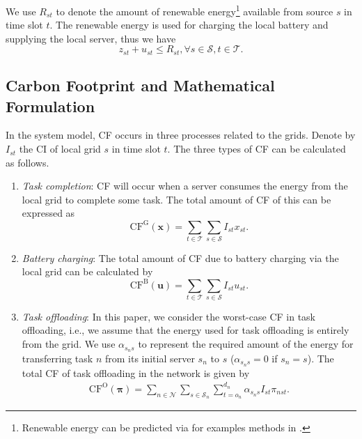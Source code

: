 \documentclass[conference, 10pt, ﬁnal, letterpaper, twocolumn]{IEEEtran}
\begin{document}
We use $R_{st}$ to denote the amount of renewable energy\footnote{Renewable energy can be predicted via for examples methods in \cite{li2019renewable}.} available from source $s$ in time slot $t$. The renewable energy is used for charging the local battery and supplying the local server, thus we have  
\begin{equation}\label{Constraint_6}
    z_{st} + u_{st} \leq R_{st}, \forall s \in \mathcal{S}, t \in \mathcal{T}.
\end{equation}

\subsection{Carbon Footprint and Mathematical Formulation} \label{subsec:CFA}

In the system model, CF occurs in three processes related to the grids. Denote by $I_{st}$ the CI of local grid $s$ in time slot $t$. The three types of CF can be calculated as follows.
\begin{enumerate}
    \item {\em Task completion}: CF will occur when a server consumes the energy from the local grid to complete some task. The total amount of CF of this can be expressed as
    \begin{equation}\label{CF_task_completion}
        \text{CF}^{\text{G}}(\boldsymbol{x}) = \sum_{t \in \mathcal{T}} \sum_{s\in \mathcal{S}} I_{st}x_{st}.
    \end{equation}
    \item {\em Battery charging}: The total amount of CF due to battery charging via the local grid can be calculated by
    \begin{equation}\label{CF_battery_charging}
        \text{CF}^{\text{B}}(\boldsymbol{u}) = \sum_{t \in \mathcal{T}} \sum_{s\in \mathcal{S}} I_{st}u_{st}.
    \end{equation}
    \item {\em Task offloading}: In this paper, we consider the worst-case CF in task offloading, i.e., we assume that the energy used for task offloading is entirely from the grid. We use $\alpha_{s_n s}$ to represent the required amount of the energy for transferring task $n$ from its initial server $s_n$ to $s$ ($\alpha_{s_n s} = 0$ if $s_n = s$). The total CF of task offloading in the network is given by
    \begin{align}\label{CF_task_offloading}
        \text{CF}^{\text{O}}(\boldsymbol{\pi}) =  \sum_{n \in \mathcal{N}} \sum_{s \in \mathcal{S}_n}  \sum^{d_n}_{t = o_n} \alpha_{s_n s} I_{st}  \pi_{nst}.
    \end{align}
\end{enumerate}
\end{document}
